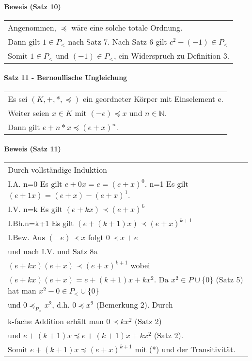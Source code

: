 \documentclass[a4paper]{scrartcl}
\begin{document}
\paragraph{Beweis (Satz 10)}
\begin{tabbing}
\begin{tabular}{l}
Angenommen, $\preceq$ wäre eine solche totale Ordnung.\\
Dann gilt $1\in P_<$ nach Satz 7. Nach Satz 6 gilt $c^2-(-1)\in P_<$\\
Somit $1\in P_<$ und $(-1)\in P_<$, ein Widerspruch zu Definition 3.
\end{tabular}
\end{tabbing}

\paragraph{Satz 11 - Bernoullische Ungleichung}
\begin{tabbing}
\begin{tabular}{l}
Es sei $(K,+,*,\preceq)$ ein geordneter Körper mit Einselement e.\\
Weiter seien $x\in K$ mit $(-e)\preceq x$ und $n\in\mathbb{N}$.\\
Dann gilt $e+n*x \preceq (e+x)^n$.
\end{tabular}
\end{tabbing}

\paragraph{Beweis (Satz 11)}
\begin{tabbing}
\begin{tabular}{l}
Durch vollständige Induktion\\
I.A. n=0 Es gilt $e+0x=e=(e+x)^0$. n=1 Es gilt $(e+1x) = (e+x) - (e+x)^1$.\\
I.V. n=k Es gilt $(e+kx) \prec (e+x)^k$\\
I.Bh.n=k+1 Es gilt $(e+(k+1)x) \prec (e+x)^{k+1}$\\
I.Bew. Aus $(-e) \prec x$ folgt $0 \prec x+e$\\
und nach I.V. und Satz 8a\\
$(e+kx)(e+x)\prec (e+x)^{k+1}$ wobei\\
$(e+kx)(e+x) = e+(k+1)x + kx^2$. Da $x^2\in P\cup\{ 0\}$ (Satz 5) hat man $x^2-0\in P_<\cup\{ 0\}$\\
und $0 \preceq_{P_<} x^2$, d.h. $0 \preceq x^2$ (Bemerkung 2). Durch\\
k-fache Addition erhält man $0 \prec kx^2$ (Satz 2)\\
und $e+(k+1)x \preceq e+(k+1)x + kx^2$ (Satz 2).\\
Somit $e+(k+1)x \preceq (e+x)^{k+1}$ mit (*) und der Transitivität.
\end{tabular}
\end{tabbing}
\end{document}
